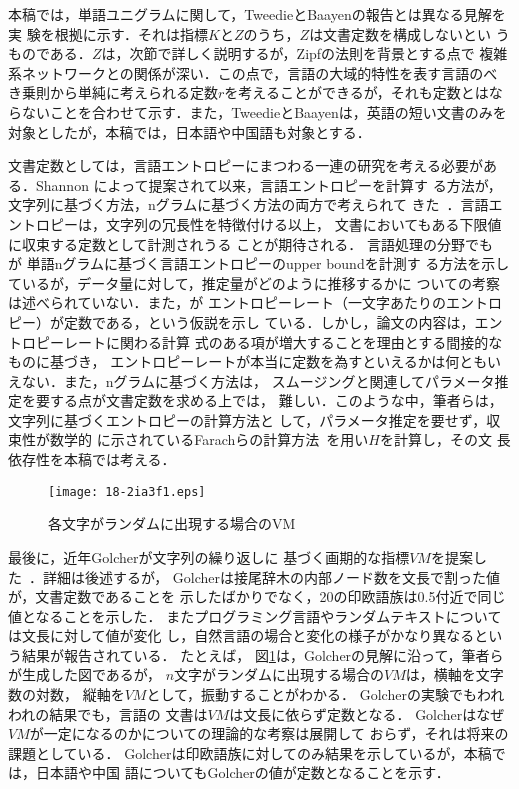 \documentclass[japanese]{jnlp_JS2.0}
\begin{document}
本稿では，単語ユニグラムに関して，TweedieとBaayenの報告とは異なる見解を実
験を根拠に示す．それは指標$K$と$Z$のうち，$Z$は文書定数を構成しないとい
うものである．$Z$は，次節で詳しく説明するが，Zipfの法則を背景とする点で
複雑系ネットワークとの関係が深い．この点で，言語の大域的特性を表す言語のべ
き乗則から単純に考えられる定数$r$を考えることができるが，それも定数とはな
らないことを合わせて示す．また，TweedieとBaayenは，英語の短い文書のみを
対象としたが，本稿では，日本語や中国語も対象とする．

文書定数としては，言語エントロピーにまつわる一連の研究を考える必要があ
る．Shannon \cite{Shannon}によって提案されて以来，言語エントロピーを計算す
る方法が，文字列に基づく方法，nグラムに基づく方法の両方で考えられて
きた~\cite{cover}．言語エントロピーは，文字列の冗長性を特徴付ける以上，
文書においてもある下限値に収束する定数として計測されうる
ことが期待される． 言語処理の分野でも~\cite{brown} が
単語nグラムに基づく言語エントロピーのupper boundを計測す
る方法を示しているが，データ量に対して，推定量がどのように推移するかに
ついての考察は述べられていない．また，\cite{genzel}が
エントロピーレート（一文字あたりのエントロピー）が定数である，という仮説を示し
ている．しかし，論文の内容は，エントロピーレートに関わる計算
式のある項が増大することを理由とする間接的なものに基づき，
エントロピーレートが本当に定数を為すといえるかは何ともい
えない．また，nグラムに基づく方法は，
スムージングと関連してパラメータ推定を要する点が文書定数を求める上では，
難しい．このような中，筆者らは，文字列に基づくエントロピーの計算方法と
して，パラメータ推定を要せず，収束性が数学的
に示されているFarachらの計算方法~\cite{Farach}を用い$H$を計算し，その文
長依存性を本稿では考える．

\begin{figure}[b]
 \begin{center}
  \texttt{[image: 18-2ia3f1.eps]}
 \end{center}
 \caption{各文字がランダムに出現する場合のVM}
 \label{zu:Golcher}
\end{figure}

最後に，近年Golcherが文字列の繰り返しに
基づく画期的な指標$\mathit{VM}$を提案した~\cite{Golcher}．詳細は後述するが，
Golcherは接尾辞木の内部ノード数を文長で割った値が，文書定数であることを
示したばかりでなく，20の印欧語族は0.5付近で同じ値となることを示した．
またプログラミング言語やランダムテキストについては文長に対して値が変化
し，自然言語の場合と変化の様子がかなり異なるという結果が報告されている．
たとえば，
図\ref{zu:Golcher}は，Golcherの見解に沿って，筆者らが生成した図であるが，
$n$文字がランダムに出現する場合の$\mathit{VM}$は，横軸を文字数の対数，
縦軸を$\mathit{VM}$として，振動することがわかる．
Golcherの実験でもわれわれの結果でも，言語の
文書は$\mathit{VM}$は文長に依らず定数となる．
Golcherはなぜ$\mathit{VM}$が一定になるのかについての理論的な考察は展開して
おらず，それは将来の課題としている．
Golcherは印欧語族に対してのみ結果を示しているが，本稿では，日本語や中国
語についてもGolcherの値が定数となることを示す．
\end{document}
